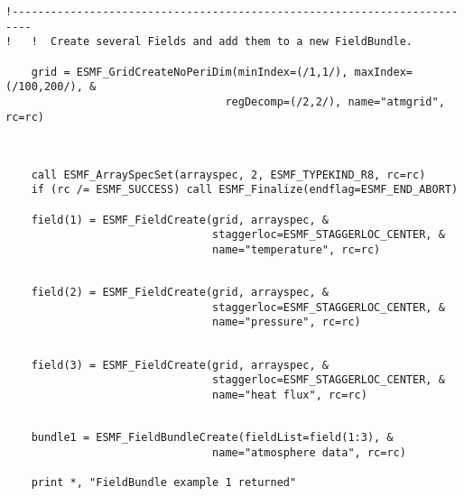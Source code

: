  \begin{verbatim}
!-------------------------------------------------------------------------
!   !  Create several Fields and add them to a new FieldBundle.
 
    grid = ESMF_GridCreateNoPeriDim(minIndex=(/1,1/), maxIndex=(/100,200/), &
                                  regDecomp=(/2,2/), name="atmgrid", rc=rc)
 
\end{verbatim}
 

 \begin{verbatim}

    call ESMF_ArraySpecSet(arrayspec, 2, ESMF_TYPEKIND_R8, rc=rc)
    if (rc /= ESMF_SUCCESS) call ESMF_Finalize(endflag=ESMF_END_ABORT)

    field(1) = ESMF_FieldCreate(grid, arrayspec, &
                                staggerloc=ESMF_STAGGERLOC_CENTER, &
                                name="temperature", rc=rc)
 
\end{verbatim}
 

 \begin{verbatim}
    field(2) = ESMF_FieldCreate(grid, arrayspec, &
                                staggerloc=ESMF_STAGGERLOC_CENTER, &
                                name="pressure", rc=rc)
 
\end{verbatim}
 

 \begin{verbatim}
    field(3) = ESMF_FieldCreate(grid, arrayspec, &
                                staggerloc=ESMF_STAGGERLOC_CENTER, &
                                name="heat flux", rc=rc)
 
\end{verbatim}
 

 \begin{verbatim}
    bundle1 = ESMF_FieldBundleCreate(fieldList=field(1:3), &
                                name="atmosphere data", rc=rc)

    print *, "FieldBundle example 1 returned"
 
\end{verbatim}
 
